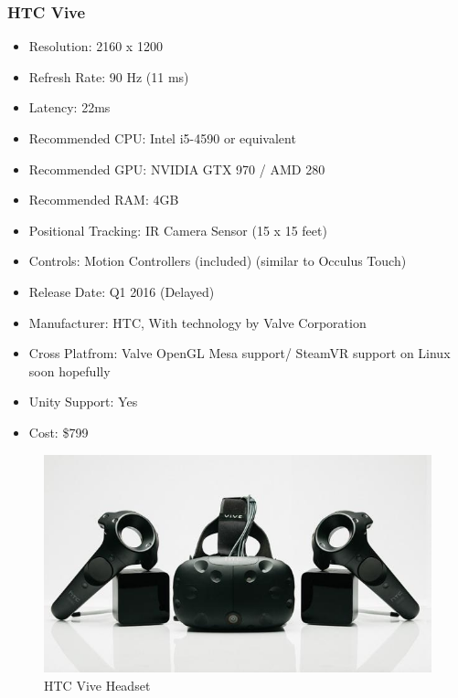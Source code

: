 \documentclass[a4paper,10pt,twoside]{article}
\begin{document}
\subsubsection{HTC Vive}
	\begin{itemize}
	  \item Resolution: 2160 x 1200
	  \item Refresh Rate: 90 Hz (11 ms)
	  \item Latency: 22ms
	  \item Recommended CPU: Intel i5-4590 or equivalent
	  \item Recommended GPU: NVIDIA GTX 970 / AMD 280 
	  \item Recommended RAM: 4GB
	  \item Positional Tracking: IR Camera Sensor (15 x 15 feet)
	  \item Controls: Motion Controllers (included) (similar to Occulus Touch)  
	  \item Release Date: Q1 2016 (Delayed)
	  \item Manufacturer: HTC, With technology by Valve Corporation
	  \item Cross Platfrom: Valve OpenGL Mesa support/ SteamVR support on Linux soon hopefully
	  \item Unity Support: Yes
	  \item Cost: \$799
	\end{itemize}
	\begin{figure}[H]
	\includegraphics[width=\linewidth,height=\paperheight,keepaspectratio]{vive.jpg}
	\caption{HTC Vive Headset}
	\label{fig:ViveImg}
	\end{figure}
	\pagebreak
\end{document}
